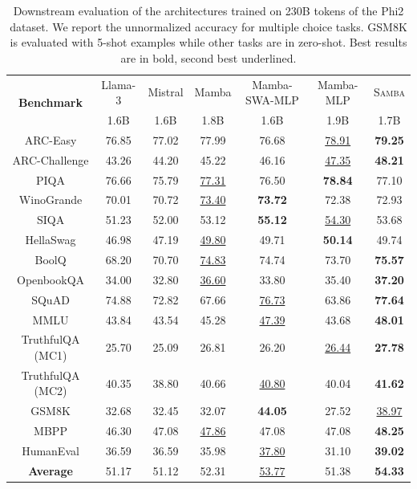 \documentclass{article}
\begin{document}
\begin{table}[h]
\renewcommand{\arraystretch}{1.1}
\centering
\small
\caption{Downstream evaluation of the architectures trained on 230B tokens of the Phi2 dataset. We report the unnormalized accuracy for multiple choice tasks. GSM8K is evaluated with 5-shot examples while other tasks are in zero-shot. Best results are in bold, second best underlined.}
\vspace{0.1cm}
\begin{tabular}{ccccccc}
\toprule
\multirow{2}{*}{\textbf{Benchmark}} &  Llama-3  & Mistral &  Mamba & Mamba-SWA-MLP  &  Mamba-MLP & \textsc{Samba}\\ 
 &   1.6B &   1.6B &  1.8B & 1.6B &  1.9B &  1.7B \\ 

\midrule
ARC-Easy & 76.85  & 77.02  & 77.99 & 76.68 &  \underline{78.91} & \bf 79.25 \\ 
ARC-Challenge & 43.26  & 44.20  & 45.22 &  46.16 & \underline{47.35} & \bf 48.21 \\ 
PIQA & 76.66  & 75.79  & \underline{77.31} & 76.50 & \bf 78.84 & 77.10 \\ 
WinoGrande & 70.01  & 70.72  & \underline{73.40} & \bf{73.72} & 72.38 & 72.93 \\ 
SIQA & 51.23  & 52.00  & 53.12 & \bf 55.12 & \underline{ 54.30} & 53.68 \\ 
\midrule
HellaSwag & 46.98  & 47.19  &\underline{49.80} &  49.71 & \bf{50.14} & 49.74 \\ 
BoolQ & 68.20  & 70.70  & \underline{74.83} & 74.74 & 73.70 & \bf{75.57} \\ 
OpenbookQA & 34.00  & 32.80  & \underline{36.60} & 33.80 & 35.40 & \bf  37.20 \\ 
SQuAD & 74.88  & 72.82  & 67.66 & \underline{76.73} & 63.86 & \bf 77.64 \\ 
MMLU & 43.84  & 43.54  & 45.28 & \underline{47.39} & 43.68 & \bf{48.01} \\ 
\midrule
TruthfulQA (MC1) & 25.70  & 25.09  & 26.81 & 26.20 & \underline{26.44} & \bf 27.78 \\ 
TruthfulQA (MC2) & 40.35  & 38.80  & 40.66 & \underline{40.80} & 40.04 & \bf 41.62 \\ 
\midrule
GSM8K & 32.68  & 32.45  & 32.07 & \bf 44.05 & 27.52 & \underline{38.97} \\ 
MBPP & 46.30  & 47.08  & \underline{47.86} &  47.08 & 47.08 &\bf 48.25 \\ 
HumanEval & 36.59  & 36.59  &  35.98 & \underline{37.80} & 31.10 & \bf 39.02 \\ 
\midrule
\textbf{Average} & 51.17  & 51.12 & 52.31 & \underline{53.77} & 51.38 & \bf 54.33 \\ 

\bottomrule
\end{tabular}
\label{tab:eval2}
\vspace{-0.2cm}
\end{table}
\end{document}
